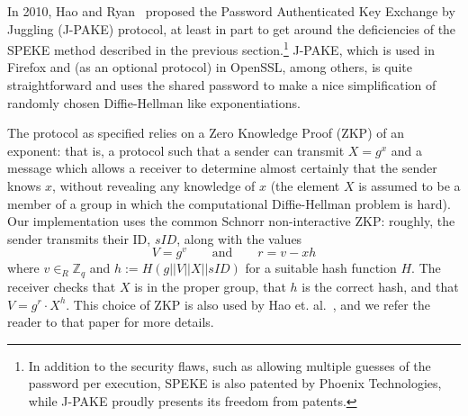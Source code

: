 In 2010, Hao and Ryan~\cite{HaRy2010} proposed the Password Authenticated Key Exchange by Juggling (J-PAKE) protocol,
at least in part to get around the deficiencies of the SPEKE method described in the previous section.\footnote{In addition
to the security flaws, such as allowing multiple guesses of the password per execution, SPEKE is also patented by Phoenix
Technologies, while J-PAKE proudly presents its freedom from patents.}  J-PAKE, which is used in Firefox and (as an optional protocol)
in OpenSSL, among others, is quite straightforward and uses the shared password to make a nice simplification of randomly chosen 
Diffie-Hellman like exponentiations.

The protocol as specified relies on a Zero Knowledge Proof (ZKP) of an exponent: that is, a protocol such that a sender can 
transmit $X = g^x$ and a message which allows a receiver to determine almost certainly that the sender knows $x$, without 
revealing any knowledge of $x$ (the element $X$ is assumed to be a member of a group in which the computational Diffie-Hellman
problem is hard).  Our implementation uses the common Schnorr non-interactive ZKP: roughly, the sender transmits their ID, $sID$, along with the values 
\[ V = g^v \qquad \text{and} \qquad r = v-xh \]
where $v \in_R \mathbb{Z}_q$ and $h := H(g || V || X || sID)$ for a suitable hash function $H$.  The receiver checks that $X$ is in the proper group, that $h$ is the correct hash, and that $V = g^r \cdot X^h$. This choice of ZKP is also used by Hao et. al.~\cite{HaYiChSh15}, and we refer the reader to that paper for more details. \\

